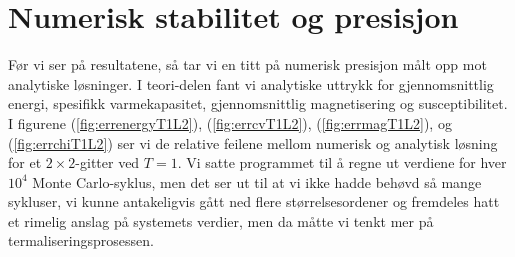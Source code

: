 \documentclass[norsk, 10pt]{article}
\begin{document}
\section*{Numerisk stabilitet og presisjon}
Før vi ser på resultatene, så tar vi en titt på numerisk presisjon målt opp mot analytiske løsninger. I teori-delen fant vi analytiske uttrykk for gjennomsnittlig energi, spesifikk varmekapasitet, gjennomsnittlig magnetisering og susceptibilitet. I figurene (\ref{fig:errenergyT1L2}), (\ref{fig:errcvT1L2}), (\ref{fig:errmagT1L2}), og (\ref{fig:errchiT1L2}) ser vi de relative feilene mellom numerisk og analytisk løsning for et $2\times 2$-gitter ved $T=1$. Vi satte programmet til å regne ut verdiene for hver $10^4$ Monte Carlo-syklus, men det ser ut til at vi ikke hadde behøvd så mange sykluser, vi kunne antakeligvis gått ned flere størrelsesordener og fremdeles hatt et rimelig anslag på systemets verdier, men da måtte vi tenkt mer på termaliseringsprosessen.
\end{document}
